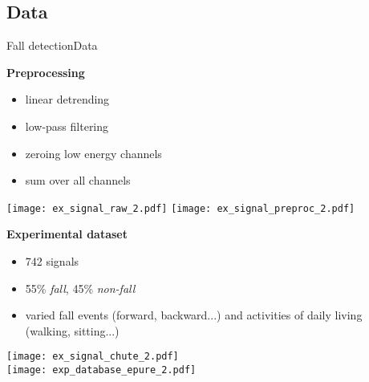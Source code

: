 \subsection{Data}
\begin{frame}{Fall detection}{Data}
\begin{minipage}[t]{0.49\linewidth}
    \vspace{0pt}
        \textbf{Preprocessing}
        \begin{itemize}
            \item linear detrending
            \item low-pass filtering
            \item zeroing low energy channels
            \item sum over all channels
        \end{itemize}
    \medskip
    \begin{overprint}
            \texttt{[image: ex\_signal\_raw\_2.pdf]}
            \texttt{[image: ex\_signal\_preproc\_2.pdf]}
    \end{overprint}
\end{minipage}\hfill
\begin{minipage}[t]{0.49\linewidth}
\vspace{0pt}
    \pause \pause
    \textbf{Experimental dataset}
    \begin{itemize}
        \item 742 signals
        \item 55\% \emph{fall}, 45\% \emph{non-fall}
        \item varied fall events (forward, backward...) and activities of daily living (walking, sitting...)
    \end{itemize}
    \medskip
    \centering
    \texttt{[image: ex\_signal\_chute\_2.pdf]}\\
    \texttt{[image: exp\_database\_epure\_2.pdf]}

\end{minipage}

\end{frame}

